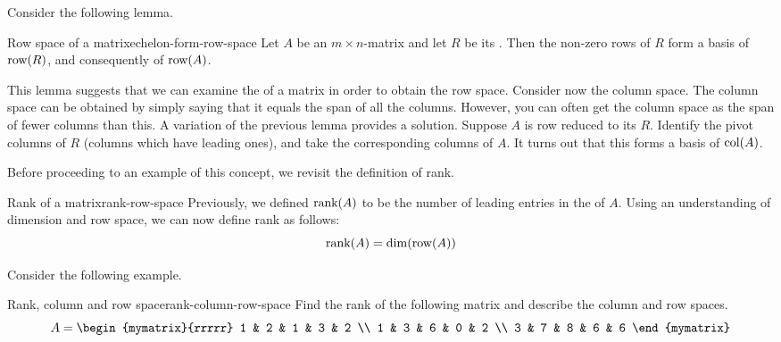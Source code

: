 Consider the following lemma.

\begin{lemma}{Row space of a {\ef} matrix}{echelon-form-row-space}
  Let $A$ be an $m \times n$-matrix and let $R$ be its {\ef}. Then the
  non-zero rows of $R$ form a basis of $\mbox{\rm row}(R)$, and
  consequently of $\mbox{\rm row}(A)$.
\end{lemma}

This lemma suggests that we can examine the {\ef} of a matrix in order
to obtain the row space. Consider now the column space. The column
space can be obtained by simply saying that it equals the span of all
the columns. However, you can often get the column space as the span
of fewer columns than this. A variation of the previous lemma provides
a solution. Suppose $A$ is row reduced to its {\ef} $R$. Identify the
pivot columns of $R$ (columns which have leading ones), and take the
corresponding columns of $A$. It turns out that this forms a basis of
$\mbox{\rm col}(A)$.

Before proceeding to an example of this concept, we revisit the
definition of rank.

\begin{definition}{Rank of a matrix}{rank-row-space}
  Previously, we defined $\mbox{\rm rank}(A)$ to be the number of leading
  entries in the {\ef} of $A$. Using an understanding of dimension and
  row space, we can now define rank as follows:
  \begin{equation*}
    \mbox{rank}(A) = \dim(\mbox{\rm row}(A))
  \end{equation*}
\end{definition}

Consider the following example.

\begin{example}{Rank, column and row space}{rank-column-row-space}
  Find the rank of the following matrix and describe the column and
  row spaces.
  \begin{equation*}
    A =
    \begin{mymatrix}{rrrrr}
      1 & 2 & 1 & 3 & 2 \\
      1 & 3 & 6 & 0 & 2 \\
      3 & 7 & 8 & 6 & 6
    \end{mymatrix}
  \end{equation*}
\end{example}

